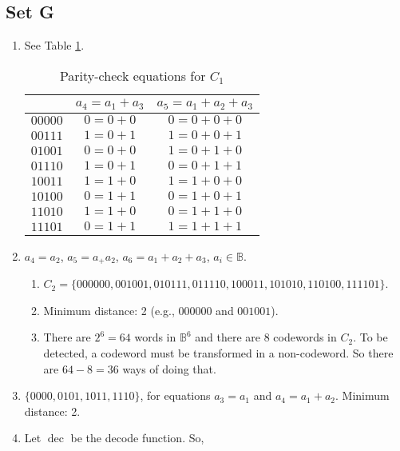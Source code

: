 \documentclass{article}
\DeclareMathOperator{\dec}{dec}
\begin{document}
\subsection*{Set G}
\begin{enumerate}
    \item See Table \ref{tab:parity-c1}.
        \begin{table}[!hb]
            \centering
            \begin{tabular}{c|c|c}
                                        & $a_4 = a_1 + a_3$ & $a_5 = a_1 + a_2 + a_3$ \\ \hline
            $00000$ & $0 = 0 + 0$       & $0 = 0 + 0 + 0$         \\
            $00111$ & $1 = 0 + 1$       & $1 = 0 + 0 + 1$         \\
            $01001$ & $0 = 0 + 0$       & $1 = 0 + 1 + 0$         \\
            $01110$ & $1 = 0 + 1$       & $0 = 0 + 1 + 1$         \\
            $10011$ & $1 = 1 + 0$       & $1 = 1 + 0 + 0$         \\
            $10100$ & $0 = 1 + 1$       & $0 = 1 + 0 + 1$         \\
            $11010$ & $1 = 1 + 0$       & $0 = 1 + 1 + 0$         \\
            $11101$ & $0 = 1 + 1$       & $1 = 1 + 1 + 1$        
            \end{tabular}
            \caption{Parity-check equations for $C_1$}
            \label{tab:parity-c1}
        \end{table}
    \item $a_4 = a_2$, $a_5 = a_ + a_2$, $a_6 = a_1 + a_2 + a_3$, $a_i \in \mathbb{B}$.
        \begin{enumerate}
            \item $C_2 = \{000000, 001001, 010111, 011110, 100011, 101010, 110100, 111101\}$.
            \item Minimum distance: 2 (e.g., $000000$ and $001001$).
            \item There are $2^6 = 64$ words in $\mathbb{B}^6$ and there are $8$ codewords in $C_2$.
            To be detected, a codeword must be transformed in a non-codeword. So there are $64 - 8 = 36$ ways of doing that.
        \end{enumerate}
    \item $\{0000, 0101, 1011, 1110\}$, for equations $a_3 = a_1$ and $a_4 = a_1 + a_2$. Minimum distance: 2.
    \item Let $\dec$ be the decode function. So,

\end{enumerate}
\end{document}
